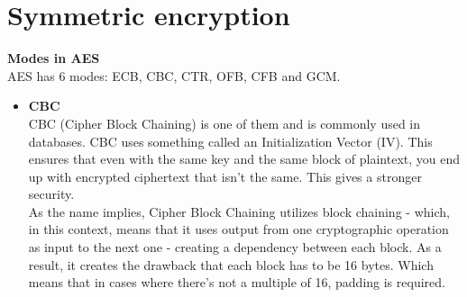 \section{Symmetric encryption}

\textbf{Modes in AES} \\
AES has 6 modes: ECB, CBC, CTR, OFB, CFB and GCM. 

\begin{itemize}{}
    \item \textbf{CBC} \\
    CBC (Cipher Block Chaining) is one of them and is commonly used in databases. CBC uses something called an Initialization Vector (IV). This ensures that even with the same key and the same block of plaintext, you end up with encrypted ciphertext that isn’t the same. This gives a stronger security. \\
    As the name implies, Cipher Block Chaining utilizes block chaining - which, in this context, means that it uses output from one cryptographic operation as input to the next one - creating a dependency between each block. As a result, it creates the drawback that each block has to be 16 bytes. Which means that in cases where there’s not a multiple of 16, padding is required. 
\end{itemize}

\newpage